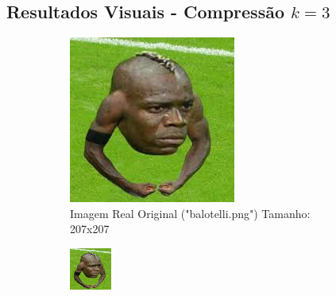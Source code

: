 \documentclass[12pt, a4paper]{article}
\begin{document}
\subsection{Resultados Visuais - Compressão $k=3$}
\begin{figure}[H]
    \centering
    \begin{subfigure}[b]{0.45\textwidth}
        \centering
        \includegraphics[width=\textwidth]{results/case_6/balotelli.png}
        \caption{Imagem Real Original ("balotelli.png") Tamanho: 207x207}
        \label{fig:selva_original_k3}
    \end{subfigure}
    \hfill
    \begin{subfigure}[b]{0.45\textwidth}
        \centering
        \includegraphics[width=\textwidth]{results/case_6/compressed_k3.png}

\end{subfigure}
\end{figure}
\end{document}
